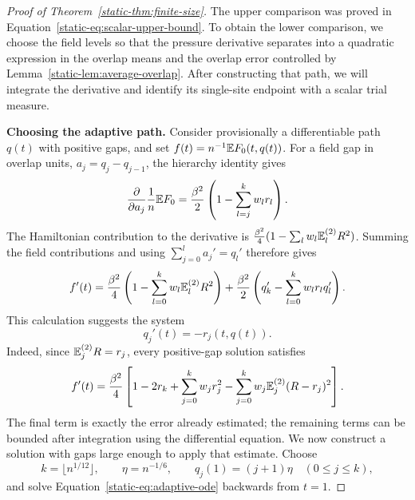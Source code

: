 \begin{proof}[Proof of Theorem~\ref{static-thm:finite-size}]
The upper comparison was proved in
Equation~\eqref{static-eq:scalar-upper-bound}. To obtain the lower
comparison, we choose the field levels so that the pressure derivative
separates into a quadratic expression in the overlap means and the
overlap error controlled by Lemma~\ref{static-lem:average-overlap}.
After constructing that path, we will integrate the derivative and
identify its single-site endpoint with a scalar trial measure.

\par\medskip\noindent\textbf{Choosing the adaptive path.}\enspace
Consider provisionally a differentiable path $q(t)$ with positive gaps,
and set $f(t)=n^{-1}\mathbb E F_0(t,q(t))$. For a field gap in overlap units,
$a_j=q_j-q_{j-1}$, the hierarchy identity gives
\begin{equation}\label{static-eq:field-gap-derivative}
 \frac{\partial}{\partial a_j}\frac1n\mathbb E F_0
 =\frac{\beta^2}{2}
       \left(1-\sum_{l=j}^kw_lr_l\right).
\end{equation}
The Hamiltonian contribution to the derivative is
$\frac{\beta^2}{4}(1-\sum_lw_l\mathbb E_l^{(2)}R^2)$.
Summing the field contributions and using
$\sum_{j=0}^la_j'=q_l'$ therefore gives
\[
 f'(t)=\frac{\beta^2}{4}
       \left(1-\sum_{l=0}^kw_l\mathbb E_l^{(2)}R^2\right)
       +\frac{\beta^2}{2}
       \left(q_k'-\sum_{l=0}^kw_lr_lq_l'\right).
\]
This calculation suggests the system
\begin{equation}\label{static-eq:adaptive-ode}
 q_j'(t)=-r_j(t,q(t)).
\end{equation}
Indeed, since $\mathbb E_j^{(2)}R=r_j$, every positive-gap solution satisfies
\begin{equation}\label{static-eq:adaptive-pressure-derivative}
 f'(t)=\frac{\beta^2}{4}\left[
 1-2r_k+\sum_{j=0}^kw_jr_j^2
          -\sum_{j=0}^kw_j\mathbb E_j^{(2)}(R-r_j)^2\right].
\end{equation}
The final term is exactly the error already estimated; the remaining
terms can be bounded after integration using the differential equation.
We now construct a solution with gaps large enough to apply that estimate.
Choose
\[
 k=\lfloor n^{1/12}\rfloor,\qquad \eta=n^{-1/6},
 \qquad q_j(1)=(j+1)\eta\quad(0\le j\le k),
\]
and solve Equation~\eqref{static-eq:adaptive-ode} backwards from $t=1$.


\end{proof}
